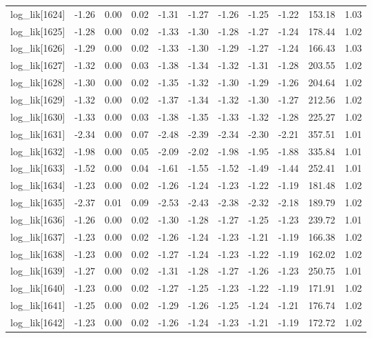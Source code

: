 \begin{table}[ht]
\begin{tabular}{rrrrrrrrrrr}
  log\_lik[1624] & -1.26 & 0.00 & 0.02 & -1.31 & -1.27 & -1.26 & -1.25 & -1.22 & 153.18 & 1.03 \\ 
  log\_lik[1625] & -1.28 & 0.00 & 0.02 & -1.33 & -1.30 & -1.28 & -1.27 & -1.24 & 178.44 & 1.02 \\ 
  log\_lik[1626] & -1.29 & 0.00 & 0.02 & -1.33 & -1.30 & -1.29 & -1.27 & -1.24 & 166.43 & 1.03 \\ 
  log\_lik[1627] & -1.32 & 0.00 & 0.03 & -1.38 & -1.34 & -1.32 & -1.31 & -1.28 & 203.55 & 1.02 \\ 
  log\_lik[1628] & -1.30 & 0.00 & 0.02 & -1.35 & -1.32 & -1.30 & -1.29 & -1.26 & 204.64 & 1.02 \\ 
  log\_lik[1629] & -1.32 & 0.00 & 0.02 & -1.37 & -1.34 & -1.32 & -1.30 & -1.27 & 212.56 & 1.02 \\ 
  log\_lik[1630] & -1.33 & 0.00 & 0.03 & -1.38 & -1.35 & -1.33 & -1.32 & -1.28 & 225.27 & 1.02 \\ 
  log\_lik[1631] & -2.34 & 0.00 & 0.07 & -2.48 & -2.39 & -2.34 & -2.30 & -2.21 & 357.51 & 1.01 \\ 
  log\_lik[1632] & -1.98 & 0.00 & 0.05 & -2.09 & -2.02 & -1.98 & -1.95 & -1.88 & 335.84 & 1.01 \\ 
  log\_lik[1633] & -1.52 & 0.00 & 0.04 & -1.61 & -1.55 & -1.52 & -1.49 & -1.44 & 252.41 & 1.01 \\ 
  log\_lik[1634] & -1.23 & 0.00 & 0.02 & -1.26 & -1.24 & -1.23 & -1.22 & -1.19 & 181.48 & 1.02 \\ 
  log\_lik[1635] & -2.37 & 0.01 & 0.09 & -2.53 & -2.43 & -2.38 & -2.32 & -2.18 & 189.79 & 1.02 \\ 
  log\_lik[1636] & -1.26 & 0.00 & 0.02 & -1.30 & -1.28 & -1.27 & -1.25 & -1.23 & 239.72 & 1.01 \\ 
  log\_lik[1637] & -1.23 & 0.00 & 0.02 & -1.26 & -1.24 & -1.23 & -1.21 & -1.19 & 166.38 & 1.02 \\ 
  log\_lik[1638] & -1.23 & 0.00 & 0.02 & -1.27 & -1.24 & -1.23 & -1.22 & -1.19 & 162.02 & 1.02 \\ 
  log\_lik[1639] & -1.27 & 0.00 & 0.02 & -1.31 & -1.28 & -1.27 & -1.26 & -1.23 & 250.75 & 1.01 \\ 
  log\_lik[1640] & -1.23 & 0.00 & 0.02 & -1.27 & -1.25 & -1.23 & -1.22 & -1.19 & 171.91 & 1.02 \\ 
  log\_lik[1641] & -1.25 & 0.00 & 0.02 & -1.29 & -1.26 & -1.25 & -1.24 & -1.21 & 176.74 & 1.02 \\ 
  log\_lik[1642] & -1.23 & 0.00 & 0.02 & -1.26 & -1.24 & -1.23 & -1.21 & -1.19 & 172.72 & 1.02 \\ 

\end{tabular}
\end{table}

